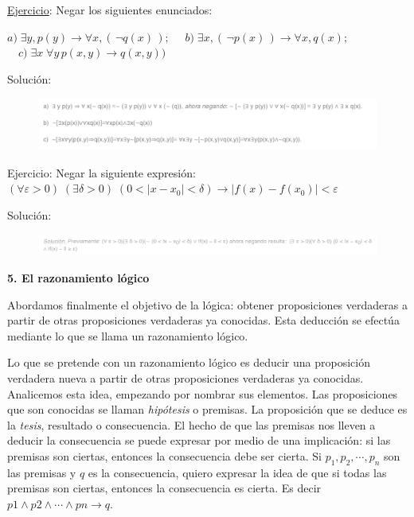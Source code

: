 \underline{Ejercicio}:  Negar los siguientes enunciados:

$a)\;  \exists y, p(y) \to \forall x, (\,\neg q(x)\,); $
$\quad    b)\;  \exists x , (\, \neg p(x)\, ) \to \forall x, q(x); $
$\quad   c)\;  \exists x\; \forall y\, p(x,y) \to q(x,y))$

Solución:

 \begin{figure}[H] 
		\centering
		\includegraphics[width=1.1\textwidth]{imagenes/apendices/APENDICESIM35.png}
	\end{figure} 

\underline{}Ejercicio:  Negar la siguiente expresión:
$(\forall \varepsilon >0)\; (\exists \delta >0)\; (0<|x-x_0|<\delta) \to |f(x)-f(x_0)|<\varepsilon   $

Solución:
 \begin{figure}[H] 
		\centering
		\includegraphics[width=1.1\textwidth]{imagenes/apendices/APENDICESIM36.png}
	\end{figure}


\vspace{5mm}\textbf{5. El razonamiento lógico}

Abordamos finalmente el objetivo de la lógica: obtener proposiciones verdaderas a partir de otras proposiciones verdaderas ya conocidas. Esta deducción se efectúa mediante lo que se llama un razonamiento lógico. 

Lo que se pretende con un razonamiento lógico es deducir una proposición verdadera nueva a partir de otras proposiciones verdaderas ya conocidas. Analicemos esta idea, empezando por nombrar sus elementos. Las proposiciones que son conocidas se llaman \emph{hipótesis} o premisas. La proposición que se deduce es la \emph{tesis}, resultado o consecuencia. El hecho de que las premisas nos lleven a deducir la consecuencia se puede expresar por medio de una implicación: si las premisas son ciertas, entonces la consecuencia debe ser cierta. Si $p_1, p_2, \cdots , p_n$  son las premisas y $q$ es la consecuencia, quiero expresar la idea de que si todas las premisas son ciertas, entonces la consecuencia es cierta. Es decir$ p1 \wedge p2 \wedge \cdots \wedge pn \to  q$.


